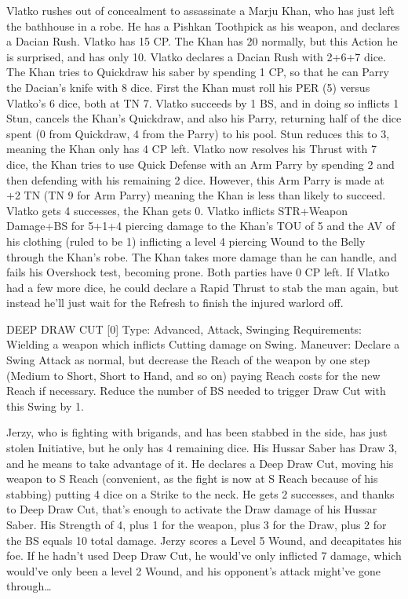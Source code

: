 \documentclass[oneside,11pt,english]{book}
\begin{document}
Vlatko rushes out of concealment to assassinate a Marju Khan, who has just left the bathhouse in a robe. He has a Pishkan Toothpick as his weapon, and declares a Dacian Rush. Vlatko has 15 CP. The Khan has 20 normally, but this Action he is surprised, and has only 10. Vlatko declares a Dacian Rush with 2+6+7 dice. The Khan tries to Quickdraw his saber by spending 1 CP, so that he can Parry the Dacian's knife with 8 dice. First the Khan must roll his PER (5) versus Vlatko's 6 dice, both at TN 7. Vlatko succeeds by 1 BS, and in doing so inflicts 1 Stun, cancels the Khan's Quickdraw, and also his Parry, returning half of the dice spent (0 from Quickdraw, 4 from the Parry) to his pool. Stun reduces this to 3, meaning the Khan only has 4 CP left. Vlatko now resolves his Thrust with 7 dice, the Khan tries to use Quick Defense with an Arm Parry by spending 2 and then defending with his remaining 2 dice. However, this Arm Parry is made at +2 TN (TN 9 for Arm Parry) meaning the Khan is less than likely to succeed. Vlatko gets 4 successes, the Khan gets 0. Vlatko inflicts STR+Weapon Damage+BS for 5+1+4 piercing damage to the Khan’s TOU of 5 and the AV of his clothing (ruled to be 1) inflicting a level 4 piercing Wound to the Belly through the Khan's robe. The Khan takes more damage than he can handle, and fails his Overshock test, becoming prone. Both parties have 0 CP left. If Vlatko had a few more dice, he could declare a Rapid Thrust to stab the man again, but instead he'll just wait for the Refresh to finish the injured warlord off.


DEEP DRAW CUT [0] 
Type: Advanced, Attack, Swinging 
Requirements: Wielding a weapon which inflicts Cutting damage on Swing. 
Maneuver: Declare a Swing Attack as normal, but decrease the Reach of the weapon by one step (Medium to Short, Short to Hand, and so on) paying Reach costs for the new Reach if necessary. Reduce the number of BS needed to trigger Draw Cut with this Swing by 1.

Jerzy, who is fighting with brigands, and has been stabbed in the side, has just stolen Initiative, but he only has 4 remaining dice. His Hussar Saber has Draw 3, and he means to take advantage of it. He declares a Deep Draw Cut, moving his weapon to S Reach (convenient, as the fight is now at S Reach because of his stabbing) putting 4 dice on a Strike to the neck. He gets 2 successes, and thanks to Deep Draw Cut, that’s enough to activate the Draw damage of his Hussar Saber. His Strength of 4, plus 1 for the weapon, plus 3 for the Draw, plus 2 for the BS equals 10 total damage. Jerzy scores a Level 5 Wound, and decapitates his foe. If he hadn’t used Deep Draw Cut, he would’ve only inflicted 7 damage, which would’ve only been a level 2 Wound, and his opponent’s attack might’ve gone through\ldots
\end{document}
